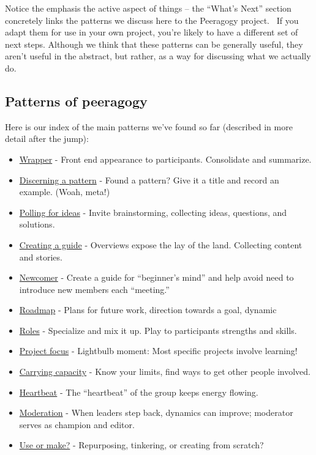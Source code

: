 Notice the emphasis the active aspect of things -- the ``What's Next''
section concretely links the patterns we discuss here to the Peeragogy
project.~ If you adapt them for use in your own project, you're likely
to have a different set of next steps. Although we think that these
patterns can be generally useful, they aren't useful in the abstract,
but rather, as a way for discussing what we actually do.

\subsection{Patterns of peeragogy}

Here is our index of the main patterns we've found so far (described in
more detail after the jump):

\begin{itemize}
\itemsep1pt\parskip0pt
\item
  \href{http://peeragogy.org/patterns/wrapper/}{Wrapper} - Front end
  appearance to participants. Consolidate and summarize.
\item
  \href{http://peeragogy.org/patterns/discerning-a-pattern/}{Discerning
  a pattern} - Found a pattern? Give it a title and record an example.
  (Woah, meta!)
\item
  \href{http://peeragogy.org/patterns/polling-for-ideas/}{Polling for
  ideas} - Invite brainstorming, collecting ideas, questions, and
  solutions.
\item
  \href{http://peeragogy.org/patterns/creating-a-guide/}{Creating a
  guide} - Overviews expose the lay of the land. Collecting content and
  stories.
\item
  \href{http://peeragogy.org/patterns/newcomer/}{Newcomer} - Create a
  guide for ``beginner's mind'' and help avoid need to introduce new
  members each ``meeting.''
\item
  \href{http://peeragogy.org/patterns/roadmap/}{Roadmap} - Plans for
  future work, direction towards a goal, dynamic
\item
  \href{http://peeragogy.org/patterns/roles/}{Roles} - Specialize and
  mix it up. Play to participants strengths and skills.
\item
  \href{http://peeragogy.org/focusing-on-a-specific-project/}{Project
  focus} - Lightbulb moment: Most specific projects involve learning!
\item
  \href{http://peeragogy.org/patterns/carrying-capacity/}{Carrying
  capacity} - Know your limits, find ways to get other people involved.
\item
  \href{http://peeragogy.org/patterns/heartbeat/}{Heartbeat} - The
  ``heartbeat'' of the group keeps energy flowing.
\item
  \href{http://peeragogy.org/patterns/moderation/}{Moderation} - When
  leaders step back, dynamics can improve; moderator serves as champion
  and editor.
\item
  \href{http://peeragogy.org/patterns/praxis-vs-poeisis/}{Use or make?}
  - Repurposing, tinkering, or creating from scratch?
\end{itemize}

